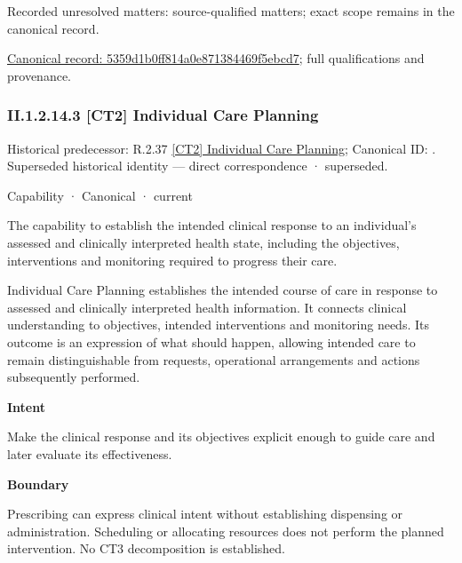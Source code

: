{\small Recorded unresolved matters: source-qualified matters; exact scope remains in the canonical record.}\par
{\footnotesize \href{../../../../continuum/strategy/capability/5359d1b0ff814a0e871384469f5ebcd7.md}{Canonical record: 5359d1b0ff814a0e871384469f5ebcd7}; full qualifications and provenance.}\par
\subsubsection*{II.1.2.14.3 [CT2] Individual Care Planning}
\label{navigation:II.1.2.14.3}

{\small Historical predecessor: R.2.37 \hyperref[element:574e61e230e643f78c58649adb4db313]{[CT2] Individual Care Planning}; Canonical ID: \texttt{}. Superseded historical identity — direct correspondence · superseded.}\par
\label{element:f036a9866459429a8fb5f5e10727b5e8}
{\small Capability · Canonical · current}\par

The capability to establish the intended clinical response to an individual's assessed and clinically interpreted health state, including the objectives, interventions and monitoring required to progress their care.



Individual Care Planning establishes the intended course of care in response to assessed and clinically interpreted health information. It connects clinical understanding to objectives, intended interventions and monitoring needs. Its outcome is an expression of what should happen, allowing intended care to remain distinguishable from requests, operational arrangements and actions subsequently performed.



\textbf{Intent}



Make the clinical response and its objectives explicit enough to guide care and later evaluate its effectiveness.



\textbf{Boundary}



Prescribing can express clinical intent without establishing dispensing or administration. Scheduling or allocating resources does not perform the planned intervention. No CT3 decomposition is established.


